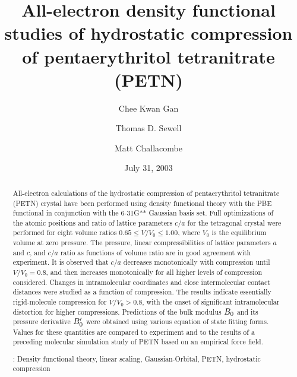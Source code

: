 \documentclass[prb,aps,nobibnotes,twocolumn,doublespace,twocolumngrid,superbib]{revtex4}
\begin{document}
\title[Short Title]{ 
All-electron density functional studies of hydrostatic compression of 
pentaerythritol tetranitrate (PETN)}
\author{Chee Kwan Gan\footnotemark[1]}
\author{Thomas D. Sewell\footnotemark[2]}
\author{Matt Challacombe\footnotemark[3]}

\date{July 31, 2003}

\begin{abstract}
All-electron calculations of the hydrostatic compression of
pentaerythritol tetranitrate (PETN) crystal have been performed using
density functional theory with the PBE functional in conjunction with
the 6-31G** Gaussian basis set.  Full optimizations of the atomic
positions and ratio of lattice parameters $c/a$ for the tetragonal
crystal were performed for eight volume ratios $0.65
\le V/V_0 \le 1.00$, where $V_0$ is the equilibrium volume at zero
pressure.  The pressure, linear compressibilities of lattice
parameters $a$ and $c$, and $c/a$ ratio as functions of volume ratio
are in good agreement with experiment.  It is observed that
$c/a$ decreases monotonically with compression until $V/V_0=0.8$, 
and then increases monotonically for all higher levels of compression
considered.  Changes in intramolecular coordinates
and close intermolecular contact distances were studied as a function
of compression.  The results indicate essentially rigid-molecule compression
for $V/V_0 >0.8$, with the onset of significant intramolecular distortion
for higher compressions.  Predictions of the bulk modulus $B_0$ and its 
pressure derivative ${B'_0}$ were obtained using various equation of 
state fitting forms. Values for these quantities are compared to 
experiment and to the results of a preceding molecular simulation study 
of PETN based on an empirical force field.

\smallskip
{}: Density functional theory, linear scaling, 
Gaussian-Orbital, PETN, hydrostatic compression
\end{abstract}

\maketitle

\end{document}
